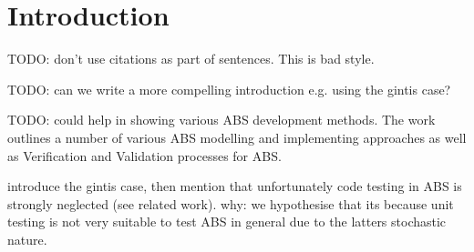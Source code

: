 \section{Introduction}
\label{sec:introduction}
TODO: don't use citations as part of sentences. This is bad style.

TODO: can we write a more compelling introduction e.g. using the gintis case?

TODO: \cite{hammer_tongs_north_2018} could help in showing various ABS development methods. The work outlines a number of various ABS modelling and implementing approaches as well as Verification and Validation processes for ABS. 

introduce the gintis case, then mention that unfortunately code testing in ABS is strongly neglected (see related work). why: we hypothesise that its because unit testing is not very suitable to test ABS in general due to the latters stochastic nature.

        


